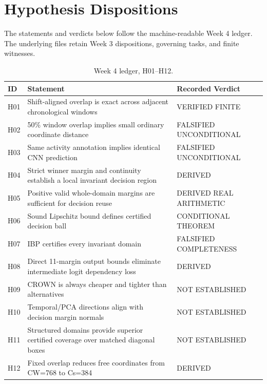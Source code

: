 \section{Hypothesis Dispositions}
The statements and verdicts below follow the machine-readable Week 4 ledger. The underlying files retain Week 3 dispositions, governing tasks, and finite witnesses.
\begin{table}[H]
\caption{Week 4 ledger, H01--H12.}
\centering\small
\begin{tabularx}{\textwidth}{@{}lYY@{}}\toprule
ID & Statement & Recorded Verdict \\
\midrule
H01 & Shift-aligned overlap is exact across adjacent chronological windows & VERIFIED FINITE \\
H02 & 50\% window overlap implies small ordinary coordinate distance & FALSIFIED UNCONDITIONAL \\
H03 & Same activity annotation implies identical CNN prediction & FALSIFIED UNCONDITIONAL \\
H04 & Strict winner margin and continuity establish a local invariant decision region & DERIVED \\
H05 & Positive valid whole-domain margins are sufficient for decision reuse & DERIVED REAL ARITHMETIC \\
H06 & Sound Lipschitz bound defines certified decision ball & CONDITIONAL THEOREM \\
H07 & IBP certifies every invariant domain & FALSIFIED COMPLETENESS \\
H08 & Direct 11-margin output bounds eliminate intermediate logit dependency loss & DERIVED \\
H09 & CROWN is always cheaper and tighter than alternatives & NOT ESTABLISHED \\
H10 & Temporal/PCA directions align with decision margin normals & NOT ESTABLISHED \\
H11 & Structured domains provide superior certified coverage over matched diagonal boxes & NOT ESTABLISHED \\
H12 & Fixed overlap reduces free coordinates from CW=768 to Cs=384 & DERIVED \\
\bottomrule\end{tabularx}
\end{table}
